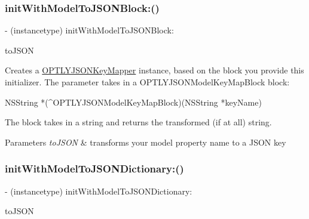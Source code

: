 \subsubsection{\texorpdfstring{init\+With\+Model\+To\+J\+S\+O\+N\+Block\+:()}{initWithModelToJSONBlock:()}}
{\footnotesize\ttfamily -\/ (instancetype) init\+With\+Model\+To\+J\+S\+O\+N\+Block\+: \begin{DoxyParamCaption}\item[{(O\+P\+T\+L\+Y\+J\+S\+O\+N\+Model\+Key\+Map\+Block)}]{to\+J\+S\+ON }\end{DoxyParamCaption}}

Creates a \mbox{\hyperlink{interface_o_p_t_l_y_j_s_o_n_key_mapper}{O\+P\+T\+L\+Y\+J\+S\+O\+N\+Key\+Mapper}} instance, based on the block you provide this initializer. The parameter takes in a O\+P\+T\+L\+Y\+J\+S\+O\+N\+Model\+Key\+Map\+Block block\+: 
\begin{DoxyPre}NSString *(^OPTLYJSONModelKeyMapBlock)(NSString *keyName)\end{DoxyPre}
 The block takes in a string and returns the transformed (if at all) string. 
\begin{DoxyParams}{Parameters}
{\em to\+J\+S\+ON} & transforms your model property name to a J\+S\+ON key \\
\hline
\end{DoxyParams}
\mbox{\label{interface_o_p_t_l_y_j_s_o_n_key_mapper_a03784bce64f0202e8541be0127661575}} 
\subsubsection{\texorpdfstring{init\+With\+Model\+To\+J\+S\+O\+N\+Dictionary\+:()}{initWithModelToJSONDictionary:()}}
{\footnotesize\ttfamily -\/ (instancetype) init\+With\+Model\+To\+J\+S\+O\+N\+Dictionary\+: \begin{DoxyParamCaption}\item[{(N\+S\+Dictionary $\ast$)}]{to\+J\+S\+ON }\end{DoxyParamCaption}}

